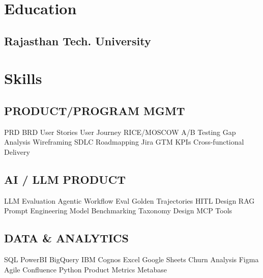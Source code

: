 \documentclass[letterpaper]{deedy-resume} %
\begin{document}
\begin{minipage}[t]{0.30\textwidth} %


\section{Education} 
\subsection{Rajasthan Tech. University}

\sectionspace %




\section{Skills}
\subsection{PRODUCT/PROGRAM MGMT}
\textbullet{} PRD \textbullet{} BRD \textbullet{} User Stories \textbullet{} User Journey \textbullet{} RICE/MOSCOW \textbullet{} A/B Testing \textbullet{} Gap Analysis \textbullet{} Wireframing \textbullet{} SDLC \textbullet{} Roadmapping \textbullet{} Jira \textbullet{} GTM \textbullet{} KPIs \textbullet{} Cross-functional Delivery
\sectionspace

\subsection{AI / LLM PRODUCT}
\textbullet{} LLM Evaluation \textbullet{} Agentic Workflow Eval \textbullet{} Golden Trajectories \textbullet{} HITL Design \textbullet{} RAG \textbullet{} Prompt Engineering \textbullet{} Model Benchmarking \textbullet{} Taxonomy Design \textbullet{} MCP Tools
\sectionspace

\subsection{DATA \& ANALYTICS}
\textbullet{} SQL \textbullet{} PowerBI \textbullet{} BigQuery \textbullet{} IBM Cognos \textbullet{} Excel \textbullet{} Google Sheets \textbullet{} Churn Analysis \textbullet{} Figma \textbullet{} Agile \textbullet{} Confluence \textbullet{} Python \textbullet{} Product Metrics \textbullet{} Metabase
\sectionspace


\end{minipage}
\end{document}
